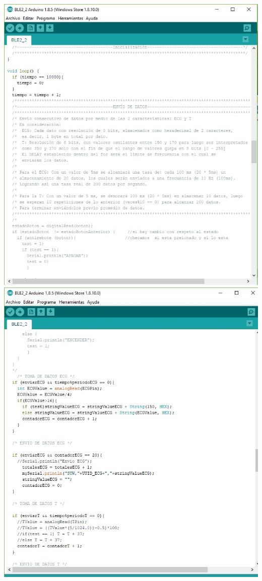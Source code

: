 \includegraphics[width=1\textwidth]{figura/anexos/code5.jpg}
\includegraphics[width=1\textwidth]{figura/anexos/code6.jpg}
